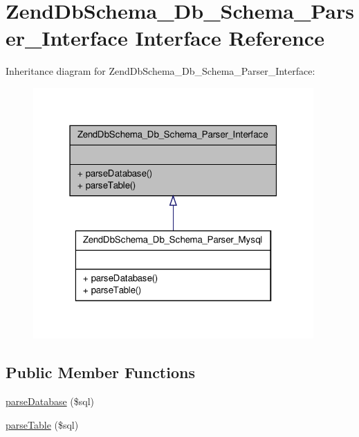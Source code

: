 \hypertarget{interfaceZendDbSchema__Db__Schema__Parser__Interface}{\section{\-Zend\-Db\-Schema\-\_\-\-Db\-\_\-\-Schema\-\_\-\-Parser\-\_\-\-Interface \-Interface \-Reference}
\label{interfaceZendDbSchema__Db__Schema__Parser__Interface}
}


\-Inheritance diagram for \-Zend\-Db\-Schema\-\_\-\-Db\-\_\-\-Schema\-\_\-\-Parser\-\_\-\-Interface\-:\nopagebreak
\begin{figure}[H]
\begin{center}
\leavevmode
\includegraphics[width=304pt]{interfaceZendDbSchema__Db__Schema__Parser__Interface__inherit__graph}
\end{center}
\end{figure}
\subsection*{\-Public \-Member \-Functions}
\begin{DoxyCompactItemize}
\item 
\hyperlink{interfaceZendDbSchema__Db__Schema__Parser__Interface_a41750688240b6b43dd682795ac198af4}{parse\-Database} (\$sql)
\item 
\hyperlink{interfaceZendDbSchema__Db__Schema__Parser__Interface_af25770aa47ce13cdf4d1cd2e6df62fb4}{parse\-Table} (\$sql)
\end{DoxyCompactItemize}


